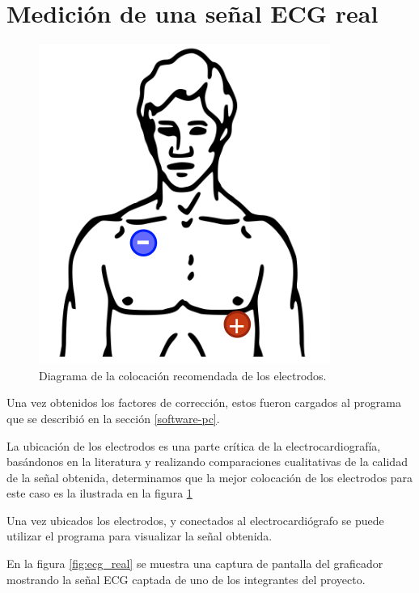\documentclass[conference]{IEEEtran}
\begin{document}
\section{Medición de una señal ECG real}


\begin{figure}[t]
    \centering
    \includegraphics[width=0.5\linewidth]{figs/ubiacion_electrodos.png}
    \caption{Diagrama de la colocación recomendada de los electrodos.}
    \label{fig:ubicacion_electrodos}

\end{figure}
Una vez obtenidos los factores de corrección, estos fueron cargados al programa
que se describió en la sección \ref{software-pc}.

La ubicación de los electrodos es una parte crítica de la electrocardiografía,
basándonos en la literatura y realizando comparaciones cualitativas de la calidad
de la señal obtenida, determinamos que la mejor colocación de los electrodos para
este caso es la ilustrada en la figura \ref{fig:ubicacion_electrodos}

Una vez ubicados los electrodos, y conectados al electrocardiógrafo se puede utilizar
el programa para visualizar la señal obtenida.

En la figura \ref{fig:ecg_real} se muestra una captura de pantalla del graficador
mostrando la señal ECG captada de uno de los integrantes del proyecto.
\end{document}
